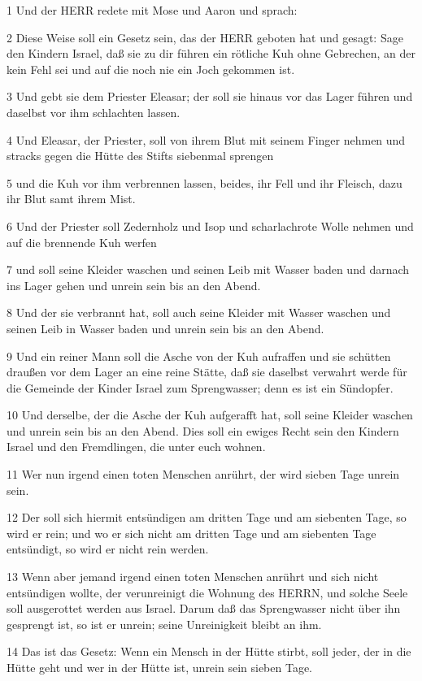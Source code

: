 \par 1 Und der HERR redete mit Mose und Aaron und sprach:
\par 2 Diese Weise soll ein Gesetz sein, das der HERR geboten hat und gesagt: Sage den Kindern Israel, daß sie zu dir führen ein rötliche Kuh ohne Gebrechen, an der kein Fehl sei und auf die noch nie ein Joch gekommen ist.
\par 3 Und gebt sie dem Priester Eleasar; der soll sie hinaus vor das Lager führen und daselbst vor ihm schlachten lassen.
\par 4 Und Eleasar, der Priester, soll von ihrem Blut mit seinem Finger nehmen und stracks gegen die Hütte des Stifts siebenmal sprengen
\par 5 und die Kuh vor ihm verbrennen lassen, beides, ihr Fell und ihr Fleisch, dazu ihr Blut samt ihrem Mist.
\par 6 Und der Priester soll Zedernholz und Isop und scharlachrote Wolle nehmen und auf die brennende Kuh werfen
\par 7 und soll seine Kleider waschen und seinen Leib mit Wasser baden und darnach ins Lager gehen und unrein sein bis an den Abend.
\par 8 Und der sie verbrannt hat, soll auch seine Kleider mit Wasser waschen und seinen Leib in Wasser baden und unrein sein bis an den Abend.
\par 9 Und ein reiner Mann soll die Asche von der Kuh aufraffen und sie schütten draußen vor dem Lager an eine reine Stätte, daß sie daselbst verwahrt werde für die Gemeinde der Kinder Israel zum Sprengwasser; denn es ist ein Sündopfer.
\par 10 Und derselbe, der die Asche der Kuh aufgerafft hat, soll seine Kleider waschen und unrein sein bis an den Abend. Dies soll ein ewiges Recht sein den Kindern Israel und den Fremdlingen, die unter euch wohnen.
\par 11 Wer nun irgend einen toten Menschen anrührt, der wird sieben Tage unrein sein.
\par 12 Der soll sich hiermit entsündigen am dritten Tage und am siebenten Tage, so wird er rein; und wo er sich nicht am dritten Tage und am siebenten Tage entsündigt, so wird er nicht rein werden.
\par 13 Wenn aber jemand irgend einen toten Menschen anrührt und sich nicht entsündigen wollte, der verunreinigt die Wohnung des HERRN, und solche Seele soll ausgerottet werden aus Israel. Darum daß das Sprengwasser nicht über ihn gesprengt ist, so ist er unrein; seine Unreinigkeit bleibt an ihm.
\par 14 Das ist das Gesetz: Wenn ein Mensch in der Hütte stirbt, soll jeder, der in die Hütte geht und wer in der Hütte ist, unrein sein sieben Tage.
